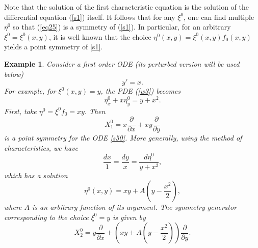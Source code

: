 \documentclass[11pt,letter,subeqn]{article}
\newtheorem{example}{Example}[section]
\begin{document}
  Note that the solution of the first characteristic equation is the solution of the differential equation (\ref{s1}) itself. It follows that for any $\xi^0$, one can find multiple $\eta^0$ so that (\ref{eq25}) is a symmetry of (\ref{s1}). In particular, for an arbitrary $\xi^0=\xi^0(x,y)$, it is well known that the choice $\eta^0(x,y)=\xi^0(x,y)f_0(x,y)$ yields a point symmetry of \eqref{s1}.
  \begin{example}\label{ex_unpert_1storder}
    Consider a first order ODE (its perturbed version will be used below)
    \begin{equation}\label{s50}
      y'=x.
    \end{equation}
 For example, for $\xi^0(x,y)=y$, the PDE (\ref{w3}) becomes
  \[
     \eta^0_x+x\eta^0_y=y+x^2.
  \]
 First, take $\eta^0=\xi^0f_0=xy.$ Then
 \begin{equation}
     X^0_1=x\dfrac{\partial}{\partial x}+ xy \dfrac{\partial}{\partial y}
  \end{equation}
  is a point symmetry for the ODE \eqref{s50}. More generally, using the method of characteristics, we have
 \begin{equation}\label{b11}
    \dfrac{dx}{1}=\dfrac{dy}{x}=\dfrac{d \eta^0}{y+x^2},
  \end{equation}
  which has a solution
  \begin{equation}\label{eta0}
   \eta^0(x,y)=xy+A \left( y-\dfrac{x^2}{2}\right),
  \end{equation}
  where $A$ is an arbitrary function of its argument. The symmetry generator corresponding to the choice $\xi^0=y$ is given by
  \begin{equation}\label{}
    X^0_2= y\dfrac{\partial}{\partial x}+ \left(xy+A \left( y-\dfrac{x^2}{2}\right)\right) \dfrac{\partial}{\partial y}.
  \end{equation}
  \end{example}
\end{document}
